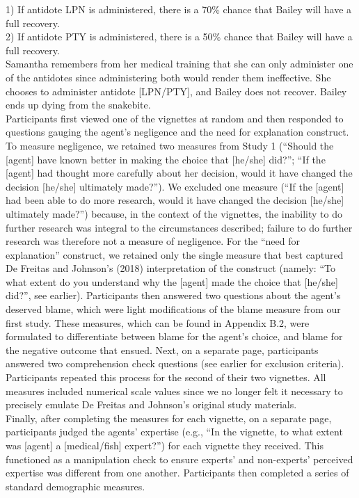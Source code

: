 \documentclass[
  man, donotrepeattitle,floatsintext]{apa6}
\begin{document}
1) If antidote LPN is administered, there is a 70\% chance that Bailey will have a full recovery.\\
2) If antidote PTY is administered, there is a 50\% chance that Bailey will have a full recovery.\\
Samantha remembers from her medical training that she can only administer one of the antidotes since administering both would render them ineffective. She chooses to administer antidote {[}LPN/PTY{]}, and Bailey does not recover. Bailey ends up dying from the snakebite.\\
Participants first viewed one of the vignettes at random and then responded to questions gauging the agent's negligence and the need for explanation construct. To measure negligence, we retained two measures from Study 1 (``Should the {[}agent{]} have known better in making the choice that {[}he/she{]} did?''; ``If the {[}agent{]} had thought more carefully about her decision, would it have changed the decision {[}he/she{]} ultimately made?''). We excluded one measure (``If the {[}agent{]} had been able to do more research, would it have changed the decision {[}he/she{]} ultimately made?'') because, in the context of the vignettes, the inability to do further research was integral to the circumstances described; failure to do further research was therefore not a measure of negligence. For the ``need for explanation'' construct, we retained only the single measure that best captured De Freitas and Johnson's (2018) interpretation of the construct (namely: ``To what extent do you understand why the {[}agent{]} made the choice that {[}he/she{]} did?'', see earlier). Participants then answered two questions about the agent's deserved blame, which were light modifications of the blame measure from our first study. These measures, which can be found in Appendix B.2, were formulated to differentiate between blame for the agent's choice, and blame for the negative outcome that ensued. Next, on a separate page, participants answered two comprehension check questions (see earlier for exclusion criteria). Participants repeated this process for the second of their two vignettes. All measures included numerical scale values since we no longer felt it necessary to precisely emulate De Freitas and Johnson's original study materials.\\
Finally, after completing the measures for each vignette, on a separate page, participants judged the agents' expertise (e.g., ``In the vignette, to what extent was {[}agent{]} a {[}medical/fish{]} expert?'') for each vignette they received. This functioned as a manipulation check to ensure experts' and non-experts' perceived expertise was different from one another. Participants then completed a series of standard demographic measures.
\end{document}

